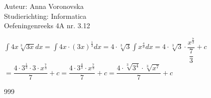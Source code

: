 \documentclass[a4paper]{article}
\begin{document}
\noindent \large Auteur: Anna Voronovska \\
\noindent \large Studierichting: Informatica \\
\noindent \large Oefeningenreeks 4A nr. 3.12 \\

\medskip

\normalsize
$\displaystyle\int 4x \sqrt[3]{3x} dx 
= \displaystyle\int 4x \cdot (3x)^{\tfrac{1}{3}} dx 
= 4 \cdot \sqrt[3]{3} \displaystyle\int x^{\tfrac{4}{3}} dx 
= 4 \cdot \sqrt[3]{3} \cdot \dfrac{x^{\tfrac{7}{3}}}{\dfrac{7}{3}} + c$\\

$= \dfrac{4 \cdot 3^{\tfrac{1}{3}} \cdot 3 \cdot x^{\tfrac{7}{3}}}{7} + c
= \dfrac{4 \cdot 3^{\tfrac{4}{3}} \cdot x^{\tfrac{7}{3}}}{7} + c
= \dfrac{4 \cdot \sqrt[3]{3^4} \cdot \sqrt[3]{x^7}}{7} + c$\\



\begin{thebibliography}{999}
\end{thebibliography}
\end{document}
